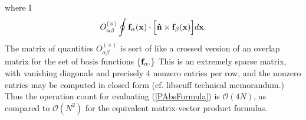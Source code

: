 \documentclass[letterpaper]{article}
\begin{document}
where I 
\begin{align*}
O^{(\times)}_{\alpha\beta}
 \oint \mathbf{f}_\alpha(\mathbf{x}) \cdot 
       \Big[\mathbf{\hat n} \times \mathbf{f}_\beta(\mathbf{x}) \Big]
       d\mathbf{x}.
\end{align*}
The matrix of quantities $O^{(\times)}_{\alpha\beta}$ is sort of like 
a crossed version of an overlap matrix for the set of 
basis functions $\{\mathbf{f}_\alpha.\}$ This is an extremely 
sparse matrix, with vanishing diagonals and precisely 4 nonzero 
entries per row, and the nonzero entries may be computed in 
closed form (cf. {\sc libscuff} technical memorandum.)
Thus the operation count for evaluating (\ref{PAbsFormula}) 
is $\mathcal{O}(4N)$, as compared to $\mathcal{O}(N^2)$ for 
the equivalent matrix-vector product formulas.
\end{document}
